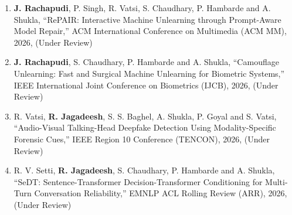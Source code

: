 \begin{Publications}
\begin{enumerate}
\item \textbf{J. Rachapudi}, P. Singh, R. Vatsi, S. Chaudhary, P. Hambarde and A. Shukla, ``RePAIR: Interactive Machine Unlearning through Prompt-Aware Model Repair,'' ACM International Conference on Multimedia (ACM MM), 2026, (Under Review)

\item \textbf{J. Rachapudi}, S. Chaudhary, P. Hambarde and A. Shukla, ``Camouflage Unlearning: Fast and Surgical Machine Unlearning for Biometric Systems,'' IEEE International Joint Conference on Biometrics (IJCB), 2026, (Under Review)

\item R. Vatsi, \textbf{R. Jagadeesh}, S. S. Baghel, A. Shukla, P. Goyal and S. Vatsi, ``Audio-Visual Talking-Head Deepfake Detection Using Modality-Specific Forensic Cues,'' IEEE Region 10 Conference (TENCON), 2026, (Under Review)

\item R. V. Setti, \textbf{R. Jagadeesh}, S. Chaudhary, P. Hambarde and A. Shukla, ``SeDT: Sentence-Transformer Decision-Transformer Conditioning for Multi-Turn Conversation Reliability,'' EMNLP ACL Rolling Review (ARR), 2026, (Under Review)

\end{enumerate}

\end{Publications}
